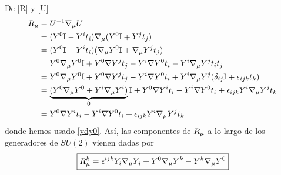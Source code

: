 De \eqref{R} y \eqref{U}
\begin{align}
  R_\mu&=U^{-1}\nabla_\mu U\\
  &=(Y^0\mathrm{I}-Y^{i}t_i)\nabla_\mu (Y^0\mathrm{I} +Y^jt_j)\\
  &=(Y^0\mathrm{I}-Y^{i}t_i)(\nabla_\mu Y^0\mathrm{I} +\nabla_\mu Y^jt_j)\\
  &=Y^0\nabla_\mu Y^0\mathrm{I}+Y^0\nabla Y^jt_j-Y^{i}\nabla Y^0t_i-Y^{i}\nabla_\mu Y^jt_it_j\\
  &=Y^0\nabla_\mu Y^0\mathrm{I}+Y^0\nabla Y^jt_j-Y^{i}\nabla Y^0t_i+Y^{i}\nabla_\mu Y^j(\delta_{ij}\mathrm{I}+\epsilon_{ijk}t_k)\\
  &=\underbrace{(Y^0\nabla_\mu Y^0+Y^{i}\nabla_\mu Y^{i})}_0\mathrm{I} +Y^0\nabla Y^it_i-Y^{i}\nabla Y^0t_i+\epsilon_{ijk}Y^{i}\nabla_\mu Y^jt_k\\
  &=Y^0\nabla Y^it_i-Y^{i}\nabla Y^0t_i+\epsilon_{ijk}Y^{i}\nabla_\mu Y^jt_k
\end{align}
donde hemos usado \eqref{ydy0}. Así, las componentes de $R_\mu $ a lo largo de los generadores de $SU(2)$ vienen dadas por
\begin{equation}
  \boxed{R_\mu^k=\epsilon^{ijk}Y_{i}\nabla_\mu Y_j+Y^0\nabla_\mu  Y^k-Y^{k}\nabla_\mu  Y^0}
\end{equation}














































